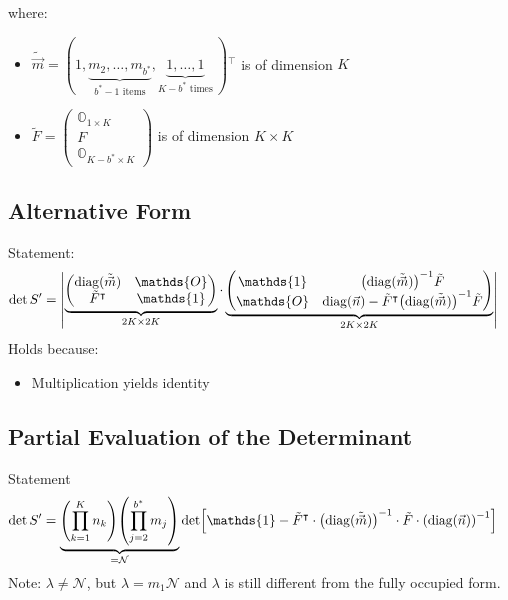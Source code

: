 \documentclass[
	english,
	a4paper,
	fontsize=10pt,
	parskip=half,
	titlepage=true,
	DIV=12,
	final
]{scrreprt}
\newcommand*{\transp}{\ensuremath{^\intercal}}
\DeclareMathOperator{\diag}{diag}
\begin{document}
where:
\begin{itemize}
\item $\tilde{\vec{m}} = (
	1,
	\underbrace{m_2, \ldots, m_{b^*}}_{b^* -1 \text{ items}},
	\underbrace{1, \ldots, 1}_{K - b^* \text{ times}}
	~)\transp$ is of dimension $K$
\item $\tilde{F} = \begin{pmatrix}
		\mathds{O}_{1 \times K} \\ 
		F \\ 
		\mathds{O}_{K - b^* \times K}
	\end{pmatrix}$
	is of dimension $K \times K$
\end{itemize}

\subsection{Alternative Form}
Statement:
\begin{align}
	\det S'
&=
	\mqty|
		\underbrace{\begin{pmatrix}
			\diag(\tilde{\vec{m}})	& \mathds{O}			\\
			\tilde{F}\transp			& \mathds{1}
		\end{pmatrix}}_{2K \times 2K}
		\cdot
		\underbrace{\begin{pmatrix}
			\mathds{1}	&	\qty(\diag(\tilde{\vec{m}}))^{-1} \tilde{F}		\\
			\mathds{O}	&	\diag(\vec{n}) - \tilde{F}\transp \qty(\diag(\tilde{\vec{m}}))^{-1}\tilde{F}
		\end{pmatrix}}_{2K \times 2K}
	|
	\label{eqn:detSProto}
\end{align}
Holds because:
\begin{itemize}
\item Multiplication yields identity
\end{itemize}

\subsection{Partial Evaluation of the Determinant}
Statement
\begin{align}
	\det S'
&=
	\underbrace{
		\qty( \prod_{k=1}^{K}   n_k )
		\qty( \prod_{j=2}^{b^*} m_j )
	}_{= \mathcal{N} }
	\det[
		\mathds{1} -
		\tilde{F}\transp \cdot \qty( \diag(\tilde{\vec{m}}) )^{-1}
		\cdot
		\tilde{F} \cdot \qty( \diag(\vec{n}) )^{-1}
	]
\label{eqn:detSPrimePartial}
\end{align}
Note: $\lambda \neq \mathcal{N}$, but $\lambda = m_1 \mathcal{N}$ {\color{red} and $\lambda$ is still different from the fully occupied form}.
\end{document}
